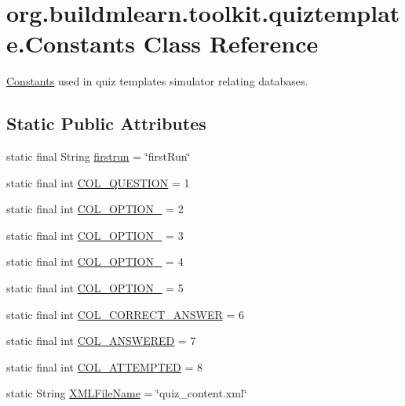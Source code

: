 \hypertarget{classorg_1_1buildmlearn_1_1toolkit_1_1quiztemplate_1_1Constants}{}\section{org.\+buildmlearn.\+toolkit.\+quiztemplate.\+Constants Class Reference}
\label{classorg_1_1buildmlearn_1_1toolkit_1_1quiztemplate_1_1Constants}


\hyperlink{classorg_1_1buildmlearn_1_1toolkit_1_1quiztemplate_1_1Constants}{Constants} used in quiz template\textquotesingle{}s simulator relating databases.  


\subsection*{Static Public Attributes}
\begin{DoxyCompactItemize}
\item 
static final String \hyperlink{classorg_1_1buildmlearn_1_1toolkit_1_1quiztemplate_1_1Constants_ac2bdb3269ee1e40c4cd2d5856050b096}{firstrun} = \char`\"{}first\+Run\char`\"{}
\item 
static final int \hyperlink{classorg_1_1buildmlearn_1_1toolkit_1_1quiztemplate_1_1Constants_a9b1694fe445fbde88810dd6e2ffe2779}{C\+O\+L\+\_\+\+Q\+U\+E\+S\+T\+I\+ON} = 1
\item 
static final int \hyperlink{classorg_1_1buildmlearn_1_1toolkit_1_1quiztemplate_1_1Constants_ab983e9f6c9b879b4d7658501f701e19c}{C\+O\+L\+\_\+\+O\+P\+T\+I\+O\+N\+\_} = 2
\item 
static final int \hyperlink{classorg_1_1buildmlearn_1_1toolkit_1_1quiztemplate_1_1Constants_a7113e07e6df256d457c586ef3190976d}{C\+O\+L\+\_\+\+O\+P\+T\+I\+O\+N\+\_} = 3
\item 
static final int \hyperlink{classorg_1_1buildmlearn_1_1toolkit_1_1quiztemplate_1_1Constants_abac2fb493c29e9320a8cac69fcad67e1}{C\+O\+L\+\_\+\+O\+P\+T\+I\+O\+N\+\_} = 4
\item 
static final int \hyperlink{classorg_1_1buildmlearn_1_1toolkit_1_1quiztemplate_1_1Constants_a03ff51f8448c3b1778b7672d567f1018}{C\+O\+L\+\_\+\+O\+P\+T\+I\+O\+N\+\_} = 5
\item 
static final int \hyperlink{classorg_1_1buildmlearn_1_1toolkit_1_1quiztemplate_1_1Constants_a97edab2d4e80504e2f7e81f2575b0718}{C\+O\+L\+\_\+\+C\+O\+R\+R\+E\+C\+T\+\_\+\+A\+N\+S\+W\+ER} = 6
\item 
static final int \hyperlink{classorg_1_1buildmlearn_1_1toolkit_1_1quiztemplate_1_1Constants_a7d3ab9a8edcab2e0bb421a508c285ad5}{C\+O\+L\+\_\+\+A\+N\+S\+W\+E\+R\+ED} = 7
\item 
static final int \hyperlink{classorg_1_1buildmlearn_1_1toolkit_1_1quiztemplate_1_1Constants_aa8c91f92812dcbb16943b58988e22d6d}{C\+O\+L\+\_\+\+A\+T\+T\+E\+M\+P\+T\+ED} = 8
\item 
static String \hyperlink{classorg_1_1buildmlearn_1_1toolkit_1_1quiztemplate_1_1Constants_ace22a76c04ad5105d7dc8fb3acfc1855}{X\+M\+L\+File\+Name} = \char`\"{}quiz\+\_\+content.\+xml\char`\"{}
\end{DoxyCompactItemize}



